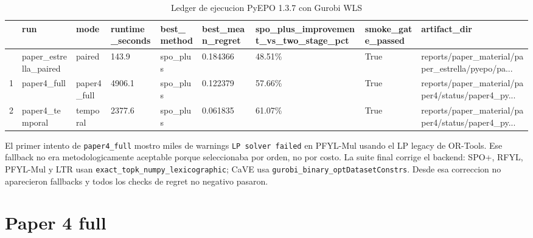 \documentclass[
  spanish,
  11pt,
  letterpaper,
]{scrbook}
\theoremstyle{plain}
\theoremstyle{remark}
\begin{document}
{

\begin{longtable}[]{@{}lllllllll@{}}

\caption{\label{tbl-p4-pyepo-execution-ledger}Ledger de ejecucion PyEPO
1.3.7 con Gurobi WLS}

\tabularnewline

\toprule\noalign{}
& run & mode & runtime\_seconds & best\_method & best\_mean\_regret &
spo\_plus\_improvement\_vs\_two\_stage\_pct & smoke\_gate\_passed &
artifact\_dir \\
\midrule\noalign{}
\endhead
\bottomrule\noalign{}
\endlastfoot
0 & paper\_estrella\_paired & paired & 143.9 & spo\_plus & 0.184366 &
48.51\% & True & reports/paper\_material/paper\_estrella/pyepo/pa... \\
1 & paper4\_full & paper4\_full & 4906.1 & spo\_plus & 0.122379 &
57.66\% & True & reports/paper\_material/paper4/status/paper4\_py... \\
2 & paper4\_temporal & temporal & 2377.6 & spo\_plus & 0.061835 &
61.07\% & True & reports/paper\_material/paper4/status/paper4\_py... \\

\end{longtable}

}

\begin{tcolorbox}[enhanced jigsaw, arc=.35mm, bottomrule=.15mm, bottomtitle=1mm, breakable, colback=white, colbacktitle=quarto-callout-note-color!10!white, colframe=quarto-callout-note-color-frame, coltitle=black, left=2mm, leftrule=.75mm, opacityback=0, opacitybacktitle=0.6, rightrule=.15mm, title=\textcolor{quarto-callout-note-color}{\faInfo}\hspace{0.5em}{Leccion de ingenieria}, titlerule=0mm, toprule=.15mm, toptitle=1mm]

El primer intento de \texttt{paper4\_full} mostro miles de warnings
\texttt{LP\ solver\ failed} en PFYL-Mul usando el LP legacy de OR-Tools.
Ese fallback no era metodologicamente aceptable porque seleccionaba por
orden, no por costo. La suite final corrige el backend: SPO+, RFYL,
PFYL-Mul y LTR usan \texttt{exact\_topk\_numpy\_lexicographic}; CaVE usa
\texttt{gurobi\_binary\_optDatasetConstrs}. Desde esa correccion no
aparecieron fallbacks y todos los checks de regret no negativo pasaron.

\end{tcolorbox}

\section{Paper 4 full}\label{paper-4-full}
\end{document}
